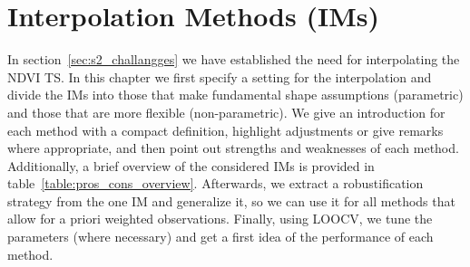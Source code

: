 \newcommand{\RobItPlot}{fitted to different (SCL45) NDVI {TS}. Iterations of a robustifing refit (as indicated in section~\ref{sec:loess_robustify}) are also displayed.}


\chapter{Interpolation Methods ({{IM}}s)} \label{sec:itpl}
	{%
		In section~\ref{sec:s2_challangges} we have established the need for interpolating the NDVI {TS}. In this chapter we first specify a setting for the interpolation and divide the {{IM}}s into those that make fundamental shape assumptions (parametric) and those that are more flexible (non-parametric). We give an introduction for each method with a compact definition, highlight adjustments or give remarks where appropriate, and then point out strengths and weaknesses of each method. Additionally, a brief overview of the considered {{IM}}s is provided in table~\ref{table:pros_cons_overview}.
		Afterwards, we extract a robustification strategy from the one {{IM}} and generalize it, so we can use it for all methods that allow for a priori weighted observations. Finally, using LOOCV, we tune the parameters (where necessary) and get a first idea of the performance of each method.


	}
	{%
		\footnotesize
		
		\normalsize
	}



